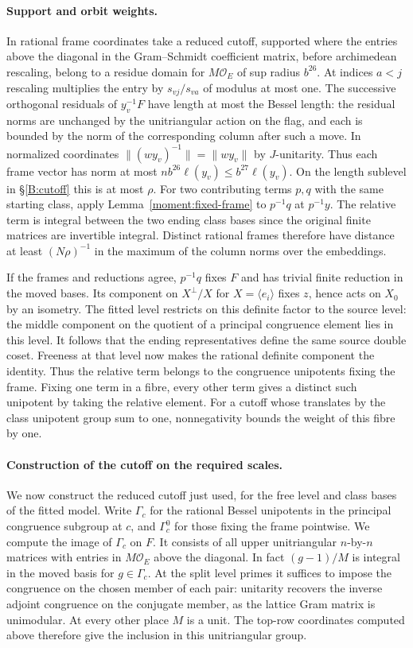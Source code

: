 \paragraph{Support and orbit weights.}
In rational frame coordinates take a reduced cutoff, supported where
the entries above the diagonal in the Gram--Schmidt coefficient matrix,
before archimedean rescaling, belong to a residue domain for
$M\mathcal O_E$ of sup radius $b^{26}$. At indices $a<j$ rescaling
multiplies the entry by $s_{vj}/s_{va}$ of modulus at most one.
The successive orthogonal residuals of $y_v^{-1}F$ have length at
most the Bessel length: the residual norms are unchanged by the
unitriangular action on the flag, and each is bounded by the norm of
the corresponding column after such a move. In normalized coordinates
$\|(wy_v)^{-1}\|=\|wy_v\|$ by $J$-unitarity. Thus each frame vector
has norm at most $n b^{26}\ell(y_v)\le b^{27}\ell(y_v)$.
On the length sublevel in \S\ref{B:cutoff} this is at most $\rho$.
For two contributing terms $p,q$ with the same starting class,
apply Lemma~\ref{moment:fixed-frame} to $p^{-1}q$ at $p^{-1}y$.
The relative term is integral between the two ending class bases since
the original finite matrices are invertible integral. Distinct rational
frames therefore have distance at least $(N\rho)^{-1}$ in the maximum
of the column norms over the embeddings.

If the frames and reductions agree, $p^{-1}q$ fixes $F$ and has
trivial finite reduction in the moved bases. Its component on
$X^\perp/X$ for $X=\langle e_i\rangle$ fixes $z$, hence acts on
$X_0$ by an isometry. The fitted level restricts on this definite
factor to the source level: the middle component on the quotient of
a principal congruence element lies in this level. It follows that
the ending representatives define the same source double coset.
Freeness at that level now makes the rational definite component
the identity. Thus the relative term belongs to the congruence
unipotents fixing the frame. Fixing one term in a fibre, every other
term gives a distinct such unipotent by taking the relative element.
For a cutoff whose translates by the class unipotent group sum to one,
nonnegativity bounds the weight of this fibre by one.

\paragraph{Construction of the cutoff on the required scales.}
We now construct the reduced cutoff just used, for the free level and
class bases of the fitted model. Write $\Gamma_c$ for the rational
Bessel unipotents in the principal congruence subgroup at $c$, and
$\Gamma_c^0$ for those fixing the frame pointwise. We compute the
image of $\Gamma_c$ on $F$. It consists of all upper unitriangular
$n$-by-$n$ matrices with entries in $M\mathcal O_E$ above the diagonal.
In fact $(g-1)/M$ is integral in the moved basis for $g\in\Gamma_c$.
At the split level primes it suffices to impose the congruence on the
chosen member of each pair: unitarity recovers the inverse adjoint
congruence on the conjugate member, as the lattice Gram matrix is
unimodular. At every other place $M$ is a unit. The top-row coordinates
computed above therefore give the inclusion in this unitriangular group.

